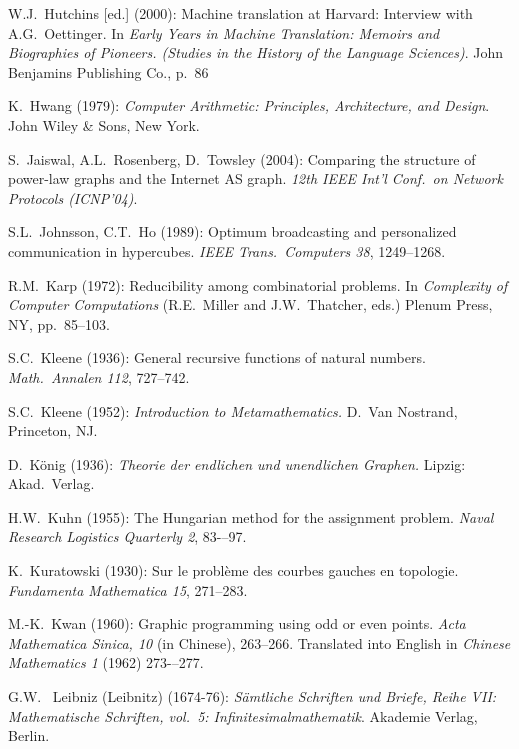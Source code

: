 \begin{thebibliography}{999}
W.J.~Hutchins [ed.] (2000):
Machine translation at Harvard: Interview with A.G.~Oettinger.
In {\it Early Years in Machine Translation: Memoirs and Biographies of
  Pioneers.  (Studies in the History of the Language Sciences)}.
John Benjamins Publishing Co., p.~86

K.~Hwang (1979):
{\it Computer Arithmetic: Principles, Architecture, and Design}.
John Wiley \& Sons, New York.





S.~Jaiswal, A.L.~Rosenberg, D.~Towsley (2004):
Comparing the structure of power-law graphs and the Internet AS graph.
{\it 12th IEEE Int'l Conf.~on Network Protocols (ICNP'04)}.

S.L.~Johnsson, C.T.~Ho (1989):
Optimum broadcasting and personalized communication in hypercubes.
{\it IEEE Trans.~Computers 38}, 1249--1268.



R.M.~Karp (1972): Reducibility among combinatorial problems.  In {\it
Complexity of Computer Computations} (R.E.~Miller and J.W.~Thatcher,
eds.)  Plenum Press, NY, pp.~85--103.

S.C.~Kleene (1936): General recursive functions of natural numbers.
{\it Math.~Annalen 112}, 727--742.

S.C.~Kleene (1952):
{\it Introduction to Metamathematics.}
D.~Van Nostrand, Princeton, NJ.

D.~K\"onig (1936):
{\it Theorie der endlichen und unendlichen Graphen.}  Lipzig: Akad.~Verlag.

H.W.~Kuhn (1955): The Hungarian method for the assignment problem.
{\it Naval Research Logistics Quarterly 2}, 83-–97.

K.~Kuratowski (1930):
Sur le probl\`{e}me des courbes gauches en topologie.
{\it Fundamenta Mathematica 15}, 271--283. 

M.-K.~Kwan (1960): Graphic programming using odd or even points.
{\it Acta Mathematica Sinica, 10} (in Chinese), 263--266.  Translated
into English in {\it Chinese Mathematics 1} (1962) 273-–277.



G.W.~ Leibniz (Leibnitz) (1674-76):
{\it S\"{a}mtliche Schriften und Briefe, Reihe VII: Mathematische
  Schriften, vol.~5: Infinitesimalmathematik}.
Akademie Verlag, Berlin.


\end{thebibliography}
